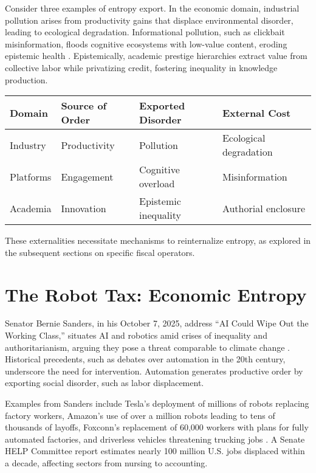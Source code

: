 \documentclass[12pt]{article}
\begin{document}
Consider three examples of entropy export. In the economic domain, industrial pollution arises from productivity gains that displace environmental disorder, leading to ecological degradation. Informational pollution, such as clickbait misinformation, floods cognitive ecosystems with low-value content, eroding epistemic health \citep{floridi2015information}. Epistemically, academic prestige hierarchies extract value from collective labor while privatizing credit, fostering inequality in knowledge production.

\begin{center}
\begin{tabular}{@{}llll@{}}
\toprule
\textbf{Domain} & \textbf{Source of Order} & \textbf{Exported Disorder} & \textbf{External Cost} \\
\midrule
Industry & Productivity & Pollution & Ecological degradation \\
Platforms & Engagement & Cognitive overload & Misinformation \\
Academia & Innovation & Epistemic inequality & Authorial enclosure \\
\bottomrule
\end{tabular}
\end{center}

These externalities necessitate mechanisms to reinternalize entropy, as explored in the subsequent sections on specific fiscal operators.

\section{The Robot Tax: Economic Entropy}
Senator Bernie Sanders, in his October 7, 2025, address ``AI Could Wipe Out the Working Class,'' situates AI and robotics amid crises of inequality and authoritarianism, arguing they pose a threat comparable to climate change \citep{sanders2025ai}. Historical precedents, such as debates over automation in the 20th century, underscore the need for intervention. Automation generates productive order by exporting social disorder, such as labor displacement.

Examples from Sanders include Tesla's deployment of millions of robots replacing factory workers, Amazon's use of over a million robots leading to tens of thousands of layoffs, Foxconn's replacement of 60,000 workers with plans for fully automated factories, and driverless vehicles threatening trucking jobs \citep{sanders2025ai}. A Senate HELP Committee report estimates nearly 100 million U.S. jobs displaced within a decade, affecting sectors from nursing to accounting.
\end{document}
